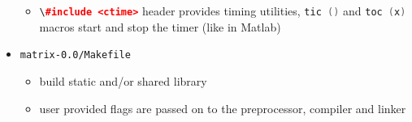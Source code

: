 \documentclass[smaller,a4paper,allowframebreaks]{beamer}
\begin{document}
\begin{frame}[allowframebreaks]
\begin{itemize}
\begin{itemize}
\item \lstinline[language=C++]{\#include <ctime>} header provides timing utilities,
      \lstinline[language=C++]{tic ()} and \lstinline[language=C++]{toc (x)} macros
      start and stop the timer (like in Matlab)
\end{itemize}
\item {\tt matrix-0.0/Makefile}\\[3mm]
\begin{itemize}
\item build static and/or shared library\\[3mm]
\item user provided flags are passed on to the preprocessor, compiler and linker
\end{itemize}

\end{itemize}
\end{frame}
\end{document}
